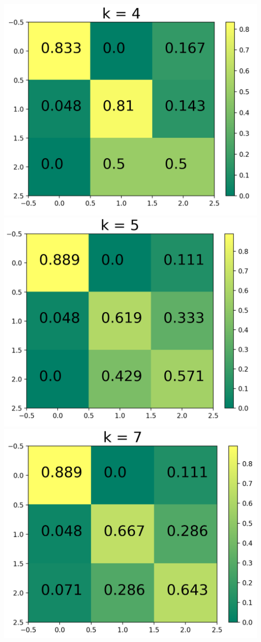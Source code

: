\documentclass[11pt]{article}
\begin{document}
\begin{center}
\includegraphics[scale=0.2]{Confusion_matrix(k=4)}
\includegraphics[scale=0.2]{Confusion_matrix(k=5)}
\includegraphics[scale=0.2]{Confusion_matrix(k=7)}
\end{center}
\end{document}
